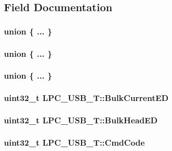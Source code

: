 \subsection{Field Documentation}
\hypertarget{structLPC__USB__T_aad085acaed0a879d61f8874e795876d0}{\subsubsection[{"@31}]{\setlength{\rightskip}{0pt plus 5cm}union \{ ... \} }}\label{structLPC__USB__T_aad085acaed0a879d61f8874e795876d0}
\hypertarget{structLPC__USB__T_a81096fc0dc55943562d96e371525aabe}{\subsubsection[{"@33}]{\setlength{\rightskip}{0pt plus 5cm}union \{ ... \} }}\label{structLPC__USB__T_a81096fc0dc55943562d96e371525aabe}
\hypertarget{structLPC__USB__T_a1435be4847cce863536b2e3568e6d8a1}{\subsubsection[{"@35}]{\setlength{\rightskip}{0pt plus 5cm}union \{ ... \} }}\label{structLPC__USB__T_a1435be4847cce863536b2e3568e6d8a1}
\hypertarget{structLPC__USB__T_a5ce486c6446a140dd9db34f23373f15c}{
\subsubsection[{Bulk\-Current\-E\-D}]{ uint32\-\_\-t L\-P\-C\-\_\-\-U\-S\-B\-\_\-\-T\-::\-Bulk\-Current\-E\-D}}\label{structLPC__USB__T_a5ce486c6446a140dd9db34f23373f15c}
\hypertarget{structLPC__USB__T_ac14ba1ced21f63a4d4cbdc080b17b776}{
\subsubsection[{Bulk\-Head\-E\-D}]{ uint32\-\_\-t L\-P\-C\-\_\-\-U\-S\-B\-\_\-\-T\-::\-Bulk\-Head\-E\-D}}\label{structLPC__USB__T_ac14ba1ced21f63a4d4cbdc080b17b776}
\hypertarget{structLPC__USB__T_a37890dcf58466be405c70eee3fbd7eec}{
\subsubsection[{Cmd\-Code}]{ uint32\-\_\-t L\-P\-C\-\_\-\-U\-S\-B\-\_\-\-T\-::\-Cmd\-Code}}\label{structLPC__USB__T_a37890dcf58466be405c70eee3fbd7eec}
